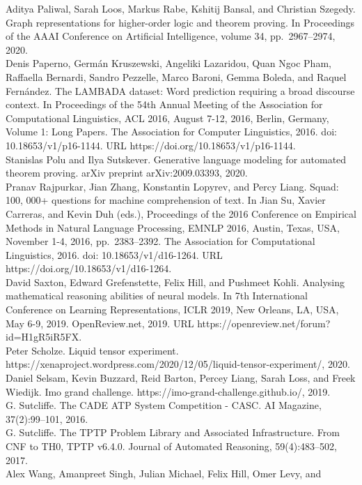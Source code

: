 \documentclass[
]{article}
\begin{document}
Aditya Paliwal, Sarah Loos, Markus Rabe, Kshitij Bansal, and Christian
Szegedy. Graph representations for higher-order logic and theorem
proving. In Proceedings of the AAAI Conference on Artificial
Intelligence, volume 34, pp.~2967--2974, 2020.\\
Denis Paperno, Germán Kruszewski, Angeliki Lazaridou, Quan Ngoc Pham,
Raffaella Bernardi, Sandro Pezzelle, Marco Baroni, Gemma Boleda, and
Raquel Fernández. The LAMBADA dataset: Word prediction requiring a broad
discourse context. In Proceedings of the 54th Annual Meeting of the
Association for Computational Linguistics, ACL 2016, August 7-12, 2016,
Berlin, Germany, Volume 1: Long Papers. The Association for Computer
Linguistics, 2016. doi: 10.18653/v1/p16-1144. URL
https://doi.org/10.18653/v1/p16-1144.\\
Stanislas Polu and Ilya Sutskever. Generative language modeling for
automated theorem proving. arXiv preprint arXiv:2009.03393, 2020.\\
Pranav Rajpurkar, Jian Zhang, Konstantin Lopyrev, and Percy Liang.
Squad: 100, 000+ questions for machine comprehension of text. In Jian
Su, Xavier Carreras, and Kevin Duh (eds.), Proceedings of the 2016
Conference on Empirical Methods in Natural Language Processing, EMNLP
2016, Austin, Texas, USA, November 1-4, 2016, pp.~2383--2392. The
Association for Computational Linguistics, 2016. doi:
10.18653/v1/d16-1264. URL https://doi.org/10.18653/v1/d16-1264.\\
David Saxton, Edward Grefenstette, Felix Hill, and Pushmeet Kohli.
Analysing mathematical reasoning abilities of neural models. In 7th
International Conference on Learning Representations, ICLR 2019, New
Orleans, LA, USA, May 6-9, 2019. OpenReview.net, 2019. URL
https://openreview.net/forum?id=H1gR5iR5FX.\\
Peter Scholze. Liquid tensor experiment.
https://xenaproject.wordpress.com/2020/12/05/liquid-tensor-experiment/,
2020.\\
Daniel Selsam, Kevin Buzzard, Reid Barton, Percey Liang, Sarah Loss, and
Freek Wiedijk. Imo grand challenge.
https://imo-grand-challenge.github.io/, 2019.\\
G. Sutcliffe. The CADE ATP System Competition - CASC. AI Magazine,
37(2):99--101, 2016.\\
G. Sutcliffe. The TPTP Problem Library and Associated Infrastructure.
From CNF to TH0, TPTP v6.4.0. Journal of Automated Reasoning,
59(4):483--502, 2017.\\
Alex Wang, Amanpreet Singh, Julian Michael, Felix Hill, Omer Levy, and
\end{document}
